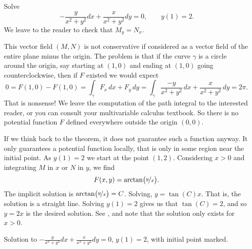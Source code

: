 \begin{example}
Solve
\begin{equation*}
-\frac{y}{x^2+y^2} dx + \frac{x}{x^2+y^2} dy = 0 , \qquad y(1) = 2.
\end{equation*}
We leave to the reader to check that
$M_y = N_x$.

This vector field $(M,N)$ is not conservative if considered as a vector
field of the entire plane minus the origin.  The problem is that if the curve $\gamma$
is a circle around the origin, say starting at $(1,0)$ and
ending at $(1,0)$ going counterclockwise, then if $F$ existed we would expect
\begin{equation*}
0 = F(1,0) - F(1,0) = \int_\gamma F_x \, dx + F_y \, dy = \int_\gamma \frac{-y}{x^2+y^2} \, dx +
\frac{x}{x^2+y^2} \, dy = 2\pi .
\end{equation*}
That is nonsense!
We leave the computation of the path integral to the interested reader, or
you can consult your multivariable calculus textbook.  So there is no
potential function $F$ defined everywhere outside the origin $(0,0)$.

If we think back to the theorem, it does not guarantee such a function
anyway.  It only guarantees a potential function locally, that is only in
some region near the initial point.  As $y(1) = 2$
we start at the point $(1,2)$.  Considering $x > 0$ and
integrating $M$ in $x$ or $N$ in $y$, we find
\begin{equation*}
F(x,y) = \operatorname{arctan} \bigl( \nicefrac{y}{x} \bigr) .
\end{equation*}
The implicit solution is 
$\operatorname{arctan} \bigl( \nicefrac{y}{x} \bigr) = C$.  Solving,
$y = \tan(C) x$.  That is, the solution is a straight line.  Solving $y(1) =
2$ gives us that $\tan(C) = 2$, and so $y= 2x$ is the desired solution.
See , and note that the solution only exists for $x >
0$.
\begin{myfig}
\capstart
{}
\caption{Solution to 
$-\frac{y}{x^2+y^2} dx + \frac{x}{x^2+y^2} dy = 0$, $y(1) = 2$,
with initial point marked.\label{exact:y2x}}
\end{myfig}
\end{example}

